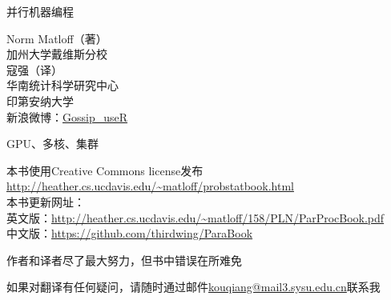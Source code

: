 \pagecolor{yellow}
\color{black}

\bigskip
\vspace{0.5in}
\bigskip
\begin{center}
{\Huge 并行机器编程}

{\LARGE Norm Matloff（著）\\
加州大学戴维斯分校\\
\bigskip
寇强（译）\\
\vspace{1 mm}
华南统计科学研究中心\\
\vspace{1 mm}
印第安纳大学\\
\vspace{1 mm}
新浪微博：\href{http://www.weibo.com/thirdwing}{Gossip\_useR}\\
\vspace{3 mm}
}





\bigskip

\vspace{0.5in}

{\LARGE GPU、多核、集群}
\end{center}
\vspace{1in}



\vspace{1.5in}
\noindent 本书使用Creative Commons license发布\\
\url{http://heather.cs.ucdavis.edu/~matloff/probstatbook.html}\\
\medskip
\noindent 本书更新网址：\\
英文版：\url{http://heather.cs.ucdavis.edu/~matloff/158/PLN/ParProcBook.pdf}\\
中文版：\url{https://github.com/thirdwing/ParaBook}

\medskip
\noindent 作者和译者尽了最大努力，但书中错误在所难免

\noindent 如果对翻译有任何疑问，请随时通过邮件\href{mailto:kouqiang@mail3.sysu.edu.cn}{kouqiang@mail3.sysu.edu.cn}联系我
\newpage

